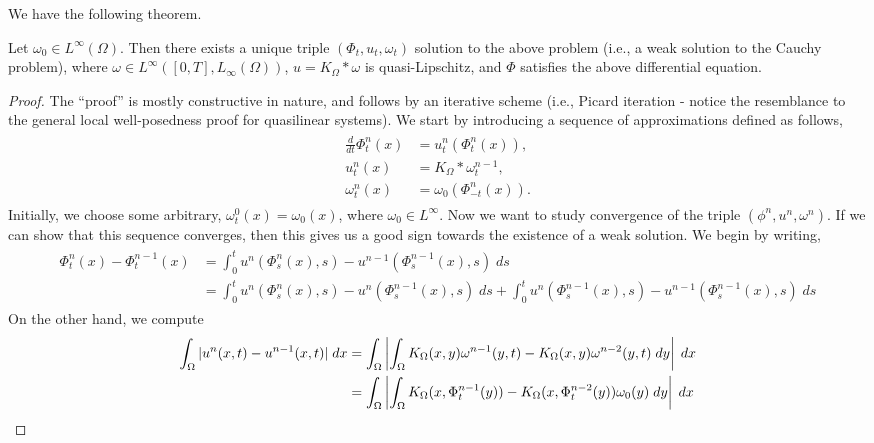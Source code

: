 \documentclass{article}
\begin{document}
We have the following theorem. 
\begin{theorem}
	Let $\omega_{0} \in L^{\infty}(\Omega)$. Then there exists a unique triple $(\Phi_{t}, u_{t}, \omega_{t})$ solution to the above problem (i.e., a weak solution to the Cauchy problem), where $\omega \in L^{\infty}([0,T], L_{\infty}(\Omega))$, $u = K_{\Omega} \ast \omega$ is quasi-Lipschitz, and $\Phi$ satisfies the above differential equation. 
\end{theorem} 
\begin{proof}
	The ``proof'' is mostly constructive in nature, and follows by an iterative scheme (i.e., Picard iteration - notice the resemblance to the general local well-posedness proof for quasilinear systems). We start by introducing a sequence of approximations defined as follows, 
	\begin{align}
		\begin{split}
			\frac{d}{dt}\Phi_{t}^{n}(x) &= u_{t}^{n}(\Phi_{t}^{n}(x)), \\
			u_{t}^{n}(x) &= K_{\Omega} \ast \omega_{t}^{n-1}, \\
			\omega_{t}^{n}(x) &= \omega_{0}(\Phi_{-t}^{n}(x)). 
		\end{split} 
	\end{align}
	Initially, we choose some arbitrary, $\omega_{t}^{0}(x) = \omega_{0}(x)$, where $\omega_{0} \in L^{\infty}$. Now we want to study convergence of the triple $(\phi^{n}, u^{n}, \omega^{n})$. If we can show that this sequence converges, then this gives us a good sign towards the existence of a weak solution. We begin by writing, 
	\begin{align*}
		\begin{split}
			\Phi_{t}^{n}(x) - \Phi_{t}^{n-1}(x) &= \int_{0}^{t}u^{n}(\Phi_{s}^{n}(x),s) - u^{n-1}(\Phi_{s}^{n-1}(x),s)\;ds \\
			&= \int_{0}^{t}u^{n}(\Phi_{s}^{n}(x),s) - u^{n}(\Phi_{s}^{n-1}(x),s)\;ds + \int_{0}^{t}u^{n}(\Phi_{s}^{n-1}(x),s) - u^{n-1}(\Phi_{s}^{n-1}(x),s)\;ds
		\end{split} 
	\end{align*}
	On the other hand, we compute 
	\begin{align*}
		\begin{split}
			\int_{\Omega}|u^{n}(x,t) - u^{n-1}(x,t)|\;dx &= \int_{\Omega}\abs{\int_{\Omega}K_{\Omega}(x,y)\omega^{n-1}(y,t) - K_{\Omega}(x,y)\omega^{n-2}(y,t)\;dy}\;dx \\
			&= \int_{\Omega}\abs{\int_{\Omega}K_{\Omega}(x,\Phi^{n-1}_{t}(y))- K_{\Omega}(x,\Phi_{t}^{n-2}(y))\omega_{0}(y)\;dy}\;dx \\

\end{split}
\end{align*}
\end{proof}
\end{document}
